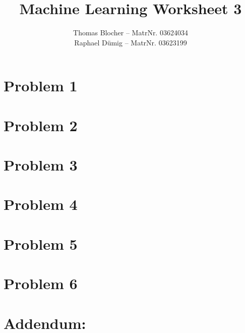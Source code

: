 \documentclass{scrartcl}
\title{Machine Learning Worksheet 3}
\author{Thomas Blocher -- MatrNr. 03624034 \\ Raphael D\"umig -- MatrNr. 03623199}
\begin{document}
\maketitle

\section*{Problem 1}


\section*{Problem 2}


\section*{Problem 3}


\section*{Problem 4}


\section*{Problem 5}


\section*{Problem 6}


\section*{Addendum:}



\end{document}
